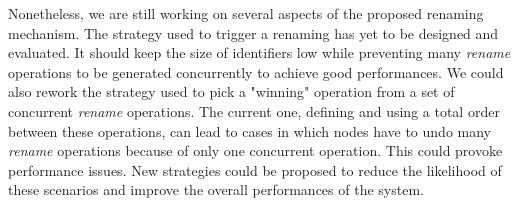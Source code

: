 \documentclass[sigplan]{acmart}
\begin{document}
Nonetheless, we are still working on several aspects of the proposed renaming mechanism.
The strategy used to trigger a renaming has yet to be designed and evaluated.
It should keep the size of identifiers low while preventing many \emph{rename} operations to be generated concurrently to achieve good performances.
We could also rework the strategy used to pick a "winning" operation from a set of concurrent \emph{rename} operations.
The current one, defining and using a total order between these operations, can lead to cases in which nodes have to undo many \emph{rename} operations because of only one concurrent operation.
This could provoke performance issues.
New strategies could be proposed to reduce the likelihood of these scenarios and improve the overall performances of the system.



\end{document}
